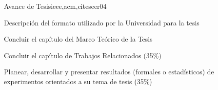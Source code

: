 \begin{syllabus}
\begin{unit}{Avance de Tesis}{ieee,acm,citeseer}{0}{4}
\begin{learningoutcomes}
      \item Descripción del formato utilizado por la Universidad para la tesis
      \item Concluir el capítulo del Marco Teórico de la Tesis
      \item Concluir el capítulo de Trabajos Relacionados (35\%)
      \item Planear, desarrollar y presentar resultados (formales o estadísticos) de experimentos orientados a su tema de tesis (35\%)
   \end{learningoutcomes}
\end{unit}



\begin{coursebibliography}

\end{coursebibliography}
\end{syllabus}
